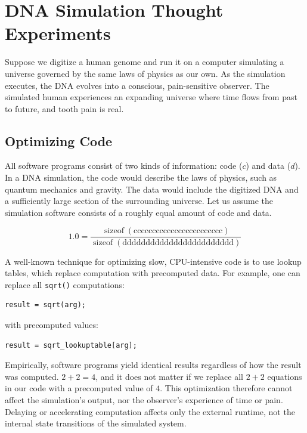 \section{DNA Simulation Thought Experiments}

Suppose we digitize a human genome and run it on a computer simulating a universe governed by the same laws of physics as our own. As the simulation executes, the DNA evolves into a conscious, pain-sensitive observer. The simulated human experiences an expanding universe where time flows from past to future, and tooth pain is real.


\subsection*{Optimizing Code}

All software programs consist of two kinds of information: code ($c$) and data ($d$). In a DNA simulation, the code would describe the laws of physics, such as quantum mechanics and gravity. The data would include the digitized DNA and a sufficiently large section of the surrounding universe. Let us assume the simulation software consists of a roughly equal amount of code and data.

\[
1.0 = \frac{\operatorname{sizeof}(\text{cccccccccccccccccccccccc})}
          {\operatorname{sizeof}(\text{dddddddddddddddddddddddd})}
\]

A well-known technique for optimizing slow, CPU-intensive code is to use lookup tables, which replace computation with precomputed data. For example, one can replace all \texttt{sqrt()} computations:

\begin{verbatim}
result = sqrt(arg);
\end{verbatim}

with precomputed values:

\begin{verbatim}
result = sqrt_lookuptable[arg];
\end{verbatim}

Empirically, software programs yield identical results regardless of how the result was computed. $2+2=4$, and it does not matter if we replace all $2+2$ equations in our code with a precomputed value of $4$. This optimization therefore cannot affect the simulation's output, nor the observer's experience of time or pain. Delaying or accelerating computation affects only the external runtime, not the internal state transitions of the simulated system.


